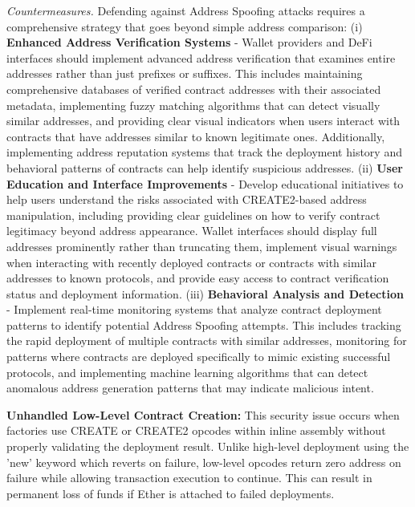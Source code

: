 \documentclass[acmsmall, screen]{acmart}
\begin{document}
	\textit{Countermeasures.} Defending against Address Spoofing attacks requires a comprehensive strategy
	that goes beyond simple address comparison: (i) \textbf{Enhanced Address Verification Systems} -
	Wallet providers and DeFi interfaces should implement advanced address verification that examines
	entire addresses rather than just prefixes or suffixes. This includes maintaining comprehensive
	databases of verified contract addresses with their associated metadata, implementing fuzzy matching
	algorithms that can detect visually similar addresses, and providing clear visual indicators
	when users interact with contracts that have addresses similar to known legitimate ones. Additionally,
	implementing address reputation systems that track the deployment history and behavioral
	patterns of contracts can help identify suspicious addresses. (ii) \textbf{User Education and
	Interface Improvements} - Develop educational initiatives to help users understand the risks
	associated with CREATE2-based address manipulation, including providing clear guidelines on how to
	verify contract legitimacy beyond address appearance. Wallet interfaces should display full
	addresses prominently rather than truncating them, implement visual warnings when interacting with
	recently deployed contracts or contracts with similar addresses to known protocols, and provide
	easy access to contract verification status and deployment information. (iii) \textbf{Behavioral
	Analysis and Detection} - Implement real-time monitoring systems that analyze contract
	deployment patterns to identify potential Address Spoofing attempts. This includes tracking the rapid
	deployment of multiple contracts with similar addresses, monitoring for patterns where contracts
	are deployed specifically to mimic existing successful protocols, and implementing machine learning
	algorithms that can detect anomalous address generation patterns that may indicate malicious intent.

	\textbf{Unhandled Low-Level Contract Creation:} This security issue occurs when factories use
	CREATE or CREATE2 opcodes within inline assembly without properly validating the deployment
	result. Unlike high-level deployment using the 'new' keyword which reverts on failure, low-level
	opcodes return zero address on failure while allowing transaction execution to continue. This can
	result in permanent loss of funds if Ether is attached to failed deployments.
\end{document}
